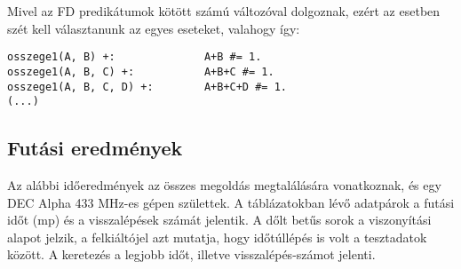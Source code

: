 Mivel az FD predikátumok kötött számú változóval dolgoznak, ezért az 
esetben szét kell választanunk az egyes eseteket, valahogy így:

\begin{verbatim}
osszege1(A, B) +:              A+B #= 1.
osszege1(A, B, C) +:           A+B+C #= 1.
osszege1(A, B, C, D) +:        A+B+C+D #= 1.
(...)
\end{verbatim}

\subsection{Futási eredmények}

Az alábbi időeredmények az összes megoldás megtalálására vonatkoznak, és egy
DEC Alpha 433 MHz-es gépen születtek. A táblázatokban lévő adatpárok a futási
időt (mp) és a visszalépések számát jelentik. A dőlt betűs sorok a viszonyítási
alapot jelzik, a felkiáltójel azt mutatja, hogy időtúllépés is volt a tesztadatok
között. A keretezés a legjobb időt, illetve visszalépés-számot jelenti.

